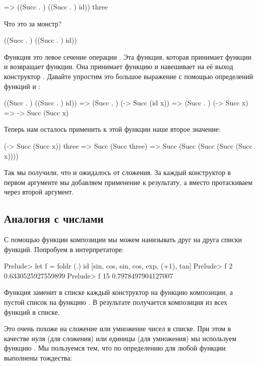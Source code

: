 \begin{code}
=>  ((Succ . ) ((Succ . ) id)) three
\end{code}

Что это за монстр?

\begin{code}
((Succ . ) ((Succ . ) id))
\end{code}

Функция  это левое сечение операции . 
Эта функция, которая принимает функции и возвращает функции.
Она принимает функцию и навешивает на её выход конструктор .
Давайте упростим это большое выражение с помощью определений функций
 и :


\begin{code}
    ((Succ . ) ((Succ . ) id))
=>   (Succ . ) (\x -> Succ (id x))
=>   (Succ . ) (\x -> Succ x)
=>   \x -> Succ (Succ x)
\end{code}

Теперь нам осталось применить к этой функции наше второе
значение:

\begin{code}
    (\x -> Succ (Succ x)) three
=>  Succ (Succ three)
=>  Succ (Succ (Succ (Succ (Succ x))))
\end{code}

Так мы получили, что и ожидалось от сложения. За каждый
конструктор  в первом аргументе мы добавляем 
применение  к результату, а вместо 
протаскиваем через  второй аргумент. 

\subsection{Аналогия с числами}


С помощью функции композиции мы можем нанизывать
друг на друга списки функций. Попробуем в интерпретаторе: 

\begin{code}
Prelude> let f = foldr (.) id [sin, cos, sin, cos, exp, (+1), tan]
Prelude> f 2
0.6330525927559899
Prelude> f 15
0.7978497904127007
\end{code}

Функция  заменит в списке каждый конструктор  \In{(:)}
на функцию композиции, а пустой список на функцию . 
В результате получается композиция из всех функций в списке.

Это очень похоже на сложение или умножение чисел в списке.
При этом в качестве нуля (для сложения) или единицы (для умножения)
мы используем функцию . Мы пользуемся тем, что по
определению для любой функции  выполнены тождества:

